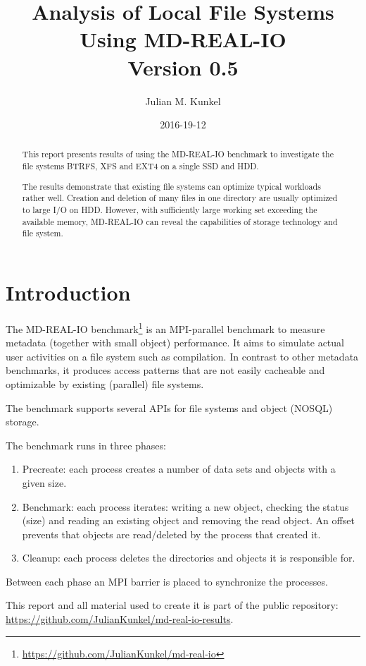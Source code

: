 \documentclass[a4paper,10pt]{article}
\title{Analysis of Local File Systems Using MD-REAL-IO\\ Version 0.5}
\author{Julian M. Kunkel}
\date{2016-19-12}
\begin{document}
\maketitle

\begin{abstract}
This report presents results of using the MD-REAL-IO benchmark to investigate the file systems
BTRFS, XFS and EXT4 on a single SSD and HDD.

The results demonstrate that existing file systems can optimize typical workloads rather well.
Creation and deletion of many files in one directory are usually optimized to large I/O on HDD.
However, with sufficiently large working set exceeding the available memory, MD-REAL-IO can reveal the capabilities of storage technology and file system.
\end{abstract}

\section{Introduction}

The MD-REAL-IO benchmark\footnote{\url{https://github.com/JulianKunkel/md-real-io}}  is an MPI-parallel benchmark to measure metadata (together with small object) performance. 
It aims to simulate actual user activities on a file system such as compilation. In contrast to other metadata benchmarks, it produces access patterns that are not easily cacheable and optimizable by existing (parallel) file systems. 

The benchmark supports several APIs for file systems and object (NOSQL) storage.

The benchmark runs in three phases:
\begin{enumerate}
\item Precreate: each process creates a number of data sets and objects with a given size.
\item Benchmark: each process iterates: writing a new object, checking the status (size) and reading an existing object and removing the read object. 
An offset prevents that objects are read/deleted by the process that created it.
\item Cleanup: each process deletes the directories and objects it is responsible for.
\end{enumerate}
Between each phase an MPI barrier is placed to synchronize the processes.

This report and all material used to create it is part of the public repository: \url{https://github.com/JulianKunkel/md-real-io-results}.
\end{document}
